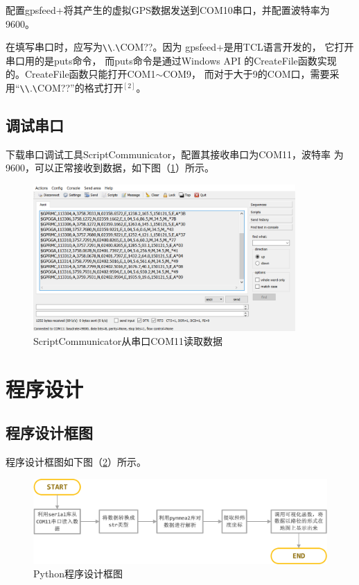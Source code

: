 \documentclass[UTF-8, a4paper, 12pt]{ctexart}
\begin{document}
配置gpsfeed+将其产生的虚拟GPS数据发送到COM10串口，并配置波特率为9600。

在填写串口时，应写为\verb|\|\verb|\|.\verb|\|COM??。因为
gpsfeed+是用TCL语言开发的，
它打开串口用的是puts命令，
而puts命令是通过Windows API
的CreateFile函数实现的。CreateFile函数只能打开COM1$\sim$COM9，
而对于大于9的COM口，需要采用“\verb|\|\verb|\|.\verb|\|COM??”的格式打开$\text{}^{[2]}$。

\subsection{调试串口}
下载串口调试工具ScriptCommunicator，配置其接收串口为COM11，波特率
为9600，可以正常接收到数据，如下图（\ref{f6}）所示。
\begin{figure}[htbp]
    \centering
    \includegraphics[width=10cm]{figs/f6.png}
    \caption{ScriptCommunicator从串口COM11读取数据}
    \label{f6}
\end{figure}
\section{程序设计}

\subsection{程序设计框图}
程序设计框图如下图（\ref{f7}）所示。
\begin{figure}[htbp]
    \centering
    \includegraphics[width=15cm]{figs/f7.jpg}
    \caption{Python程序设计框图}
    \label{f7}
\end{figure}
\end{document}

